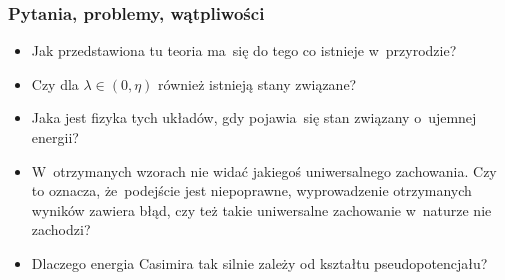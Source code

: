 \documentclass[10pt,t]{beamer}
\begin{document}
\begin{frame}
  \frametitle{Pytania, problemy, wątpliwości}


  \begin{itemize}
    \RaggedRight

  \item Jak przedstawiona tu teoria ma~się do tego co istnieje
    w~przyrodzie?

  \item Czy dla $\lambda \in ( 0, \eta )$ również istnieją stany związane?

  \item Jaka jest fizyka tych układów, gdy pojawia~się stan
    związany o~ujemnej energii?

  \item W~otrzymanych wzorach nie widać jakiegoś uniwersalnego
    zachowania. Czy to oznacza, że~podejście jest niepoprawne,
    wyprowadzenie otrzymanych wyników zawiera błąd, czy też
    takie uniwersalne zachowanie w~naturze nie
    zachodzi?

  \item Dlaczego energia Casimira tak silnie zależy od kształtu
    pseudopotencjału?

  \end{itemize}

\end{frame}










\appendix











\printbibliography











\end{document}
